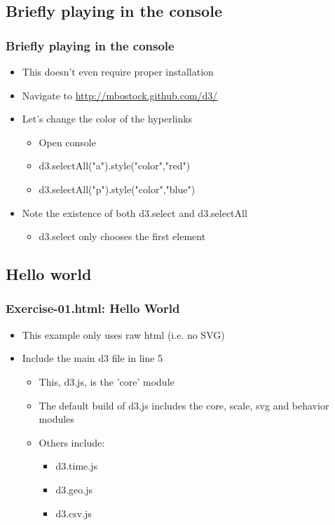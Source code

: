 \documentclass{beamer}
\begin{document}
\subsection{Briefly playing in the console}

\begin{frame}
    \frametitle{Briefly playing in the console}
    \begin{itemize}
    \item This doesn't even require proper installation
    \item Navigate to \href{http://mbostock.github.com/d3/}{http://mbostock.github.com/d3/}
    \item Let's change the color of the hyperlinks
        \begin{itemize}
        \item Open console
        \item d3.selectAll("a").style("color","red")
        \item d3.selectAll("p").style("color","blue")
        \end{itemize}
    \item Note the existence of both d3.select and d3.selectAll
        \begin{itemize}
        \item d3.select only chooses the first element
        \end{itemize}
    \end{itemize}
\end{frame}



\subsection{Hello world}

\begin{frame}
    \frametitle{Exercise-01.html: Hello World}
    \begin{itemize}
    \item This example only uses raw html (i.e. no SVG)
    \item Include the main d3 file in line 5
        \begin{itemize}
        \item This, d3.js, is the 'core' module
        \item The default build of d3.js includes the core, scale, svg and behavior modules
        \item Others include:
            \begin{itemize}
            \item d3.time.js
            \item d3.geo.js
            \item d3.csv.js
            \end{itemize}
        \end{itemize}
    \end{itemize}
\end{frame}
\end{document}
